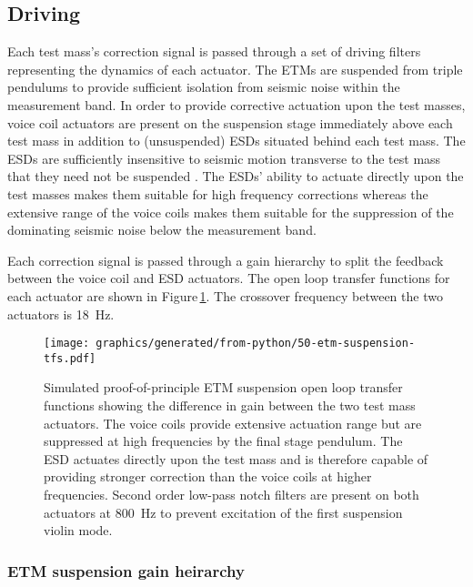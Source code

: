 \subsection{Driving}

Each test mass's correction signal is passed through a set of driving filters representing the dynamics of each actuator. The ETMs are suspended from triple pendulums to provide sufficient isolation from seismic noise within the measurement band. In order to provide corrective actuation upon the test masses, voice coil actuators are present on the suspension stage immediately above each test mass in addition to (unsuspended) ESDs situated behind each test mass. The ESDs are sufficiently insensitive to seismic motion transverse to the test mass that they need not be suspended \cite{Wittel2015}. The ESDs' ability to actuate directly upon the test masses makes them suitable for high frequency corrections whereas the extensive range of the voice coils makes them suitable for the suppression of the dominating seismic noise below the measurement band.

Each correction signal is passed through a gain hierarchy to split the feedback between the voice coil and ESD actuators. The open loop transfer functions for each actuator are shown in Figure\,\ref{fig:suspension-crossover}. The crossover frequency between the two actuators is \SI{18}{\hertz}.

\begin{figure}
  \texttt{[image: graphics/generated/from-python/50-etm-suspension-tfs.pdf]}
  \caption{\label{fig:suspension-crossover}Simulated proof-of-principle \SSM{} \gls{ETM} suspension open loop transfer functions showing the difference in gain between the two test mass actuators. The voice coils provide extensive actuation range but are suppressed at high frequencies by the final stage pendulum. The \gls{ESD} actuates directly upon the test mass and is therefore capable of providing stronger correction than the voice coils at higher frequencies. Second order low-pass notch filters are present on both actuators at \SI{800}{\hertz} to prevent excitation of the first suspension violin mode.}
\end{figure}

\subsubsection{ETM suspension gain heirarchy}

